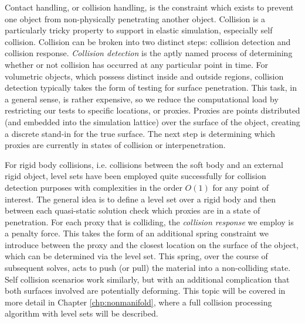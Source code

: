   Contact handling, or collision handling, is the constraint which
  exists to prevent one object from non-physically penetrating another
  object. Collision is a particularly tricky property to support in
  elastic simulation, especially self collision. Collision can be
  broken into two distinct steps: collision detection and collision
  response. \textit{Collision detection} is the aptly named process of
  determining whether or not collision has occurred at any particular
  point in time. For volumetric objects, which possess distinct inside
  and outside regions, collision detection typically takes the form of
  testing for surface penetration. This task, in a general sense, is
  rather expensive, so we reduce the computational load by restricting
  our tests to specific locations, or proxies. Proxies are points
  distributed (and embedded into the simulation lattice) over the
  surface of the object, creating a discrete stand-in for the true
  surface. The next step is determining which proxies are currently in
  states of collision or interpenetration.

  For rigid body collisions, i.e. collisions between the soft body and
  an external rigid object, level sets have been employed quite
  successfully for collision detection
  purposes\citep{TeranSIF:2005,McAdaZSETTS:2011} with complexities in
  the order $O(1)$ for any point of interest. The general idea is to
  define a level set over a rigid body and then between each
  quasi-static solution check which proxies are in a state of
  penetration. For each proxy that is colliding, the \textit{collision
    response} we employ is a penalty force. This takes the form of an
  additional spring constraint we introduce between the proxy and the
  closest location on the surface of the object, which can be
  determined via the level set. This spring, over the course of
  subsequent solves, acts to push (or pull) the material into a
  non-colliding state.  Self collision scenarios work similarly, but
  with an additional complication that both surfaces involved are
  potentially deforming. This topic will be covered in more detail in
  Chapter \ref{chp:nonmanifold}, where a full collision processing
  algorithm with level sets will be described.

